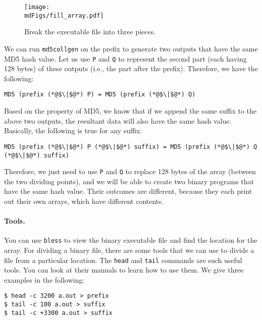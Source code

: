 \begin{figure}[htb]
\begin{center}
\texttt{[image: \\mdFigs/fill\_array.pdf]}
\end{center}
\caption{Break the executable file into three pieces.}
\label{md5:fig:fill_array}
\end{figure}
 
We can run \texttt{md5collgen} on the prefix to generate 
two outputs that have the same MD5 hash value.
Let us use \texttt{P} and \texttt{Q} to represent the 
second part (each having 128 bytes) of these outputs (i.e., the part after the prefix). 
Therefore, we have the following:

\begin{lstlisting}
MD5 (prefix (*@$\|$@*) P) = MD5 (prefix (*@$\|$@*) Q)
\end{lstlisting}

Based on the property of MD5, we know that if we append the same suffix to 
the above two outputs, the resultant data will also have the 
same hash value. Basically, the following is true for any suffix:

\begin{lstlisting}
MD5 (prefix (*@$\|$@*) P (*@$\|$@*) suffix) = MD5 (prefix (*@$\|$@*) Q (*@$\|$@*) suffix)
\end{lstlisting}

Therefore, we just need to use \texttt{P} and \texttt{Q} to replace 
128 bytes of the array (between the two dividing points), and we will be able to
create two binary programs that have the same hash value. 
Their outcomes are different, because they each print out their own arrays, which have
different contents. 


\paragraph{Tools.} You can use \texttt{bless}
to view the binary executable file and find the location for the 
array. For dividing a binary file, there are some 
tools that we can use to 
divide a file from a particular location. The \texttt{head} 
and \texttt{tail} commands are such useful tools. 
You can look at their manuals to
learn how to use them. We give three examples in the following:  

\begin{lstlisting}
$ head -c 3200 a.out > prefix
$ tail -c 100 a.out > suffix
$ tail -c +3300 a.out > suffix
\end{lstlisting}

